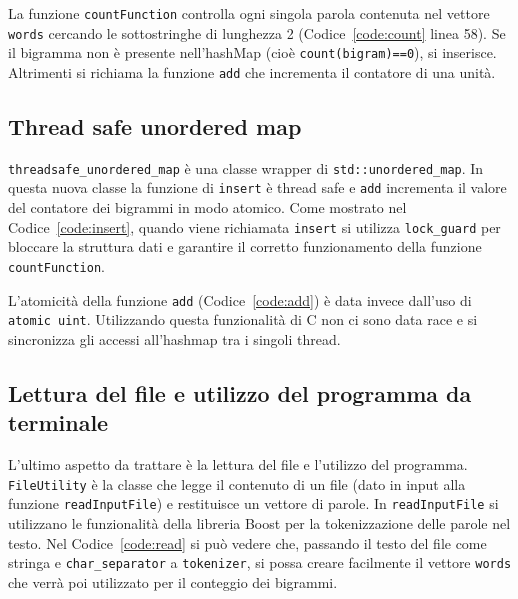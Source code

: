 \documentclass[10pt,twocolumn,letterpaper]{article}
\newcommand{\Rplus}{\protect\hspace{-.1em}\protect\raisebox{.35ex}{\smaller{\smaller\textbf{+}}}}
\newcommand{\CC}{\mbox{C\Rplus\Rplus}\xspace}
\newcommand{\code}[1]{\texttt{#1}}
\begin{document}


La funzione \code{countFunction} controlla ogni singola parola contenuta nel vettore \code{words} cercando le sottostringhe di lunghezza 2 (Codice~\ref{code:count} linea 58).
Se il bigramma non è presente nell'hashMap (cioè \code{count(bigram)==0}), si inserisce.
Altrimenti si richiama la funzione \code{add} che incrementa il contatore di una unità.


\subsection{Thread safe unordered map}
\code{threadsafe\_unordered\_map} è una classe wrapper di \code{std::unordered\_map}. In questa nuova classe la funzione di \code{insert} è thread safe e
\code{add} incrementa il valore del contatore dei bigrammi in modo atomico.
Come mostrato nel Codice~\ref{code:insert}, quando viene richiamata \code{insert} si utilizza \code{lock\_guard} per bloccare la struttura dati e garantire
il corretto funzionamento della funzione \code{countFunction}.


L'atomicità della funzione \code{add} (Codice~\ref{code:add}) è data invece dall'uso di \code{atomic uint}. Utilizzando questa funzionalità di \CC non ci sono data race e si sincronizza
gli accessi all'hashmap tra i singoli thread.


\subsection{Lettura del file e utilizzo del programma da terminale}
L'ultimo aspetto da trattare è la lettura del file e l'utilizzo del programma.
\code{FileUtility} è la classe che legge il contenuto di un file (dato in input alla funzione \code{readInputFile}) e restituisce un vettore di parole.
In \code{readInputFile} si utilizzano le funzionalità della libreria Boost per la tokenizzazione delle parole nel testo.
Nel Codice~\ref{code:read} si può vedere che, passando il testo del file come stringa e \code{char\_separator} a \code{tokenizer}, si possa creare facilmente
il vettore \code{words} che verrà poi utilizzato per il conteggio dei bigrammi.

\end{document}
